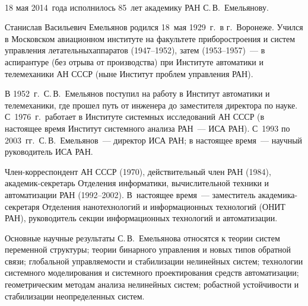 

\vspace*{12pt}


          \begin{multicols}{2}


            \begin{center}
\mbox{%
\epsfxsize=57.143mm
}
\end{center}

\vspace*{6pt}



  18 мая 2014~года исполнилось 85~лет академику РАН С.\,В.~Емельянову.

     Станислав Васильевич Емельянов родился 18~мая 1929~г.\ в г.~Воронеже. Учился в Московском авиационном
институте на факультете приборостроения и систем управления летательных\linebreak аппаратов (1947--1952), затем
(1953--1957)~--- в аспирантуре (без отрыва от производства) при Институте автоматики и телемеханики АН СССР (ныне
Институт проблем управления РАН).

     В 1952~г.\ С.\,В.~Емельянов поступил на работу в Институт автоматики и телемеханики, где прошел путь от
инженера до заместителя директора по науке. С~1976~г.\ работает в Институте системных исследований АН СССР (в
настоящее время Институт системного анализа РАН~--- ИСА РАН). С~1993 по 2003~гг.\ С.\,В.~Емельянов~--- директор
ИСА РАН; в настоящее время~--- научный руководитель ИСА РАН.

     Член-корреспондент АН СССР (1970), действительный член РАН (1984), ака\-де\-мик-сек\-ре\-тарь Отделения
информатики, вычислительной техники и автоматизации РАН (1992--2002). В~настоящее время~---
заместитель
ака\-де\-ми\-ка-сек\-ре\-та\-ря Отделения нанотехнологий и информационных технологий (ОНИТ РАН), руководитель
секции информационных технологий и автоматизации.

     Основные научные результаты С.\,В.~Емельянова относятся к теории систем переменной структуры; теории
бинарного управления и новых типов обратной связи; глобальной управляемости и стабилизации нелинейных систем;
технологии системного моделирования и системного проектирования средств автоматизации; геометрическим методам
анализа нелинейных систем; робастной устой\-чи\-вости и стабилизации неопределенных систем.


\end{multicols}
